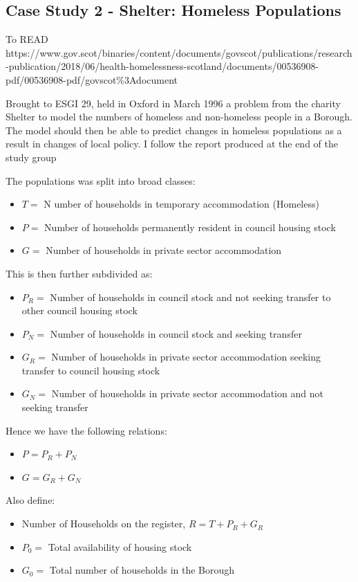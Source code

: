 \documentclass[11pt]{article} %
\begin{document}
	
	
	\subsection{Case Study 2 - Shelter: Homeless Populations \label{homeless}}
	
To READ https://www.gov.scot/binaries/content/documents/govscot/publications/research-publication/2018/06/health-homelessness-scotland/documents/00536908-pdf/00536908-pdf/govscot\%3Adocument
	
   Brought to ESGI 29, held in Oxford in March 1996 a problem from the charity Shelter to model the numbers of homeless and non-homeless people in a Borough. The model should then be able to predict changes in homeless populations as a result in changes of local policy. I follow the report produced at the end of the study group \cite{Shelter1996}
	
	The populations was split into broad classes: 
	\begin{itemize}
		\item $ T= $ N umber of households in temporary accommodation (Homeless)
		\item $  P= $ Number of households permanently resident in council housing stock
		\item $ G= $ Number of households in private sector accommodation 
	\end{itemize}
	This is then further subdivided as:
	\begin{itemize}
		\item $ P_R= $ Number of households in council stock and not  seeking transfer to other council housing stock 
		\item $ P_N= $ Number of households in council stock and seeking transfer 
		\item $ G_R= $ Number of households in private sector accommodation seeking transfer to council housing stock 
		\item $ G_N= $ Number of households in private sector accommodation and not seeking transfer
	\end{itemize}

Hence we have the following relations:
\begin{itemize}
	\item $ P=P_R+P_N $
	\item $ G=G_R+G_N $
	
\end{itemize}

Also define: 
\begin{itemize}
	\item Number of Households on the register,  $  R=T+P_R+G_R $
	\item $ P_0 = $ Total availability of housing stock 
	\item $ G_0= $ Total number of households in the Borough
\end{itemize}
\end{document}
